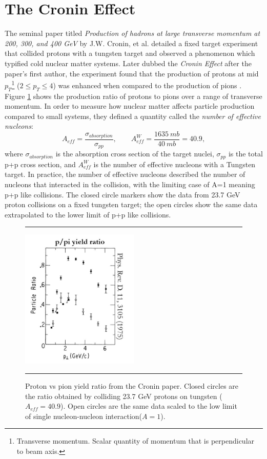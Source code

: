 \section{The Cronin Effect}
The seminal paper titled \textit{Production of hadrons at large transverse momentum at 200, 300, and 400 GeV} by J.W. Cronin, et al. detailed a fixed target experiment that collided protons with a tungsten target and observed a phenomenon which typified cold nuclear matter systems. Later dubbed the \textit{Cronin Effect} after the paper's first author, the experiment found that the production of protons at mid $p_{T}$\footnote{Transverse momentum. Scalar quantity of momentum that is perpendicular to beam axis.} ($2\leq p_{T} \leq 4$) was enhanced when compared to the production of pions \citep{croninpaper}. Figure \ref{fig:croninratio} shows the production ratio of protons to pions over a range of transverse momentum. In order to measure how nuclear matter affects particle production compared to small systems, they defined a quantity called the \textit{number of effective nucleons}:
\begin{equation}
A_{eff} = \frac{\sigma_{absorption}}{\sigma_{pp}}, \qquad A^W_{eff} = \frac{1635\: mb}{40\: mb} = 40.9,
\end{equation}
where $\sigma_{absorption}$ is the absorption cross section of the target nuclei, $\sigma_{pp}$ is the total p+p cross section, and $A^W_{eff}$ is the number of effective nucleons with a Tungsten target. In practice, the number of effective nucleons described the number of nucleons that interacted in the collision, with the limiting case of A=1 meaning p+p like collisions. The closed circle markers show the data from 23.7 GeV proton collisions on a fixed tungsten target; the open circles show the same data extrapolated to the lower limit of p+p like collisions.
\begin{figure}[htbp!]
  \centering    \rule{35em}{0.5pt}
    \includegraphics[width=0.5\textwidth]{prevplots/croninratio.JPG}

  \caption[Proton vs pion yield ratio from the Cronin paper]{Proton vs pion yield ratio from the Cronin paper. Closed circles are the ratio obtained by colliding 23.7 GeV protons on tungsten ($A_{eff}= 40.9$). Open circles are the same data scaled to the low limit of single nucleon-nucleon interaction($A=1$).}
  \label{fig:croninratio}    \rule{35em}{0.5pt}
\end{figure}


